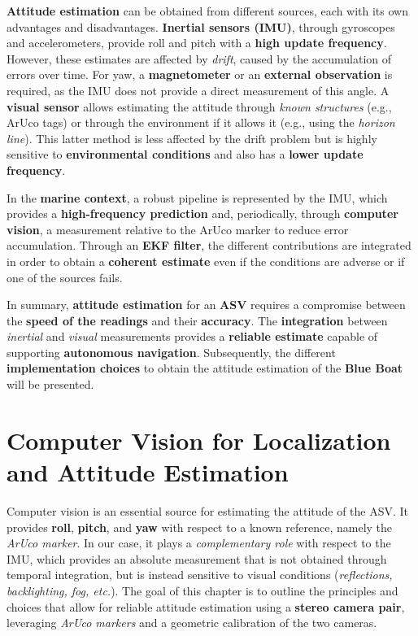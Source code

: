 \textbf{Attitude estimation} can be obtained from different sources, each with its own advantages and disadvantages. \textbf{Inertial sensors (IMU)}\cite{IMU_Euler}, through gyroscopes and accelerometers, provide roll and pitch with a \textbf{high update frequency}. However, these estimates are affected by \textit{drift}, caused by the accumulation of errors over time. For yaw, a \textbf{magnetometer} or an \textbf{external observation} is required, as the IMU does not provide a direct measurement of this angle. A \textbf{visual sensor} allows estimating the attitude through \textit{known structures} (e.g., ArUco tags) or through the environment if it allows it (e.g., using the \textit{horizon line}). This latter method is less affected by the drift problem but is highly sensitive to \textbf{environmental conditions} and also has a \textbf{lower update frequency}.  

In the \textbf{marine context}, a robust pipeline is represented by the IMU, which provides a \textbf{high-frequency prediction} and, periodically, through \textbf{computer vision}, a measurement relative to the ArUco marker to reduce error accumulation. Through an \textbf{EKF filter}\cite{EKS_IMU_cv}, the different contributions are integrated in order to obtain a \textbf{coherent estimate} even if the conditions are adverse or if one of the sources fails.  

In summary, \textbf{attitude estimation} for an \textbf{ASV} requires a compromise between the \textbf{speed of the readings} and their \textbf{accuracy}. The \textbf{integration} between \textit{inertial} and \textit{visual} measurements provides a \textbf{reliable estimate} capable of supporting \textbf{autonomous navigation}. Subsequently, the different \textbf{implementation choices} to obtain the attitude estimation of the \textbf{Blue Boat} will be presented.  

\section[Computer Vision and Attitude Estimation]{Computer Vision for Localization and Attitude Estimation}

Computer vision is an essential source for estimating the attitude of the ASV. 
It provides \textbf{roll}, \textbf{pitch}, and \textbf{yaw} with respect to a known reference, 
namely the \textit{ArUco marker}. In our case, it plays a \textit{complementary role} with respect to the IMU, 
which provides an absolute measurement that is not obtained through temporal integration, 
but is instead sensitive to visual conditions (\textit{reflections, backlighting, fog, etc.}).
The goal of this chapter is to outline the principles and choices that allow for reliable 
attitude estimation using a \textbf{stereo camera pair}, leveraging \textit{ArUco markers} 
and a geometric calibration of the two cameras.

